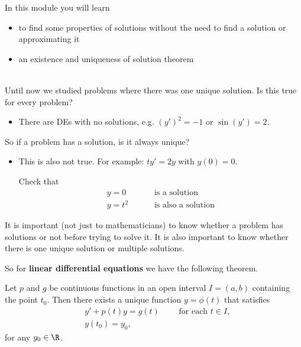 In this module you will learn
\begin{itemize}
	\item to find some properties of solutions without the need to find a solution or approximating it
	\item an existence and uniqueness of solution theorem
\end{itemize}

\hfill \\


Until now we studied problems where there was one unique solution. Is this true for every problem?

\begin{itemize}
\item There are DEs with no solutions, e.g. $(y')^2  =  -1$ or $\sin(y') = 2$.
\end{itemize}

So if a problem has a solution, is it always unique?

\begin{itemize}
\item This is also not true. For example: $t y' = 2y$ with $y(0)=0$.

Check that
\begin{align*}
y=0 \qquad & \text{ is a solution} \\
y = t^2 \qquad & \text{ is also a solution}
\end{align*}
\end{itemize}

\hfill 


It is important (not just to mathematicians) to know whether a problem has solutions or not before trying to solve it. 
It is also important to know whether there is one unique solution or multiple solutions.

So for {\bf linear differential equations} we have the following theorem.

\begin{theorem}
Let $p$ and $g$ be continuous functions in an open interval $I = (a,b)$ containing the point $t_0$.
Then there exists a unique function $y=\phi(t)$ that satisfies
\begin{align*}
& y' + p(t) y = g(t) \qquad \text{ for each $t \in I$,} \\
& y(t_0) = y_0,
\end{align*}
for any $y_0 \in \R$.
\end{theorem}

